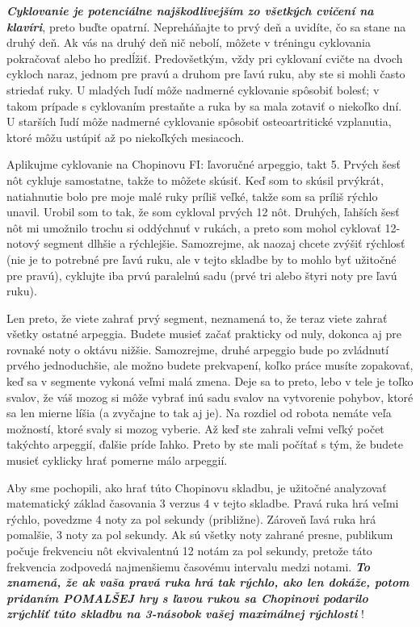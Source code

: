 \documentclass[11pt,a4paper%
]{book}
\begin{document}
\emph{\textbf{Cyklovanie je potenciálne najškodlivejším zo všetkých cvičení na klavíri}}, preto buďte opatrní. Nepreháňajte to prvý deň a uvidíte, čo sa stane na druhý deň. Ak vás na druhý deň nič nebolí, môžete v tréningu cyklovania pokračovať alebo ho predĺžiť. Predovšetkým, vždy pri cyklovaní cvičte na dvoch cykloch naraz, jednom pre pravú a druhom pre ľavú ruku, aby ste si mohli často striedať ruky. U mladých ľudí môže nadmerné cyklovanie spôsobiť bolesť; v takom prípade s cyklovaním prestaňte a ruka by sa mala zotaviť o niekoľko dní. U starších ľudí môže nadmerné cyklovanie spôsobiť osteoartritické vzplanutia, ktoré môžu ustúpiť až po niekoľkých mesiacoch.

Aplikujme cyklovanie na Chopinovu FI: ľavoručné arpeggio, takt 5. Prvých šesť nôt cykluje samostatne, takže to môžete skúsiť. Keď som to skúsil prvýkrát, natiahnutie bolo pre moje malé ruky príliš veľké, takže som sa príliš rýchlo unavil. Urobil som to tak, že som cykloval prvých 12 nôt. Druhých, ľahších šesť nôt mi umožnilo trochu si oddýchnuť v rukách, a preto som mohol cyklovať 12-notový segment dlhšie a rýchlejšie. Samozrejme, ak naozaj chcete zvýšiť rýchlosť (nie je to potrebné pre ľavú ruku, ale v tejto skladbe by to mohlo byť užitočné pre pravú), cyklujte iba prvú paralelnú sadu (prvé tri alebo štyri noty pre ľavú ruku).

Len preto, že viete zahrať prvý segment, neznamená to, že teraz viete zahrať všetky ostatné arpeggia. Budete musieť začať prakticky od nuly, dokonca aj pre rovnaké noty o oktávu nižšie. Samozrejme, druhé arpeggio bude po zvládnutí prvého jednoduchšie, ale možno budete prekvapení, koľko práce musíte zopakovať, keď sa v segmente vykoná veľmi malá zmena. Deje sa to preto, lebo v tele je toľko svalov, že váš mozog si môže vybrať inú sadu svalov na vytvorenie pohybov, ktoré sa len mierne líšia (a zvyčajne to tak aj je). Na rozdiel od robota nemáte veľa možností, ktoré svaly si mozog vyberie. Až keď ste zahrali veľmi veľký počet takýchto arpeggií, ďalšie príde ľahko. Preto by ste mali počítať s tým, že budete musieť cyklicky hrať pomerne málo arpeggií.

Aby sme pochopili, ako hrať túto Chopinovu skladbu, je užitočné analyzovať matematický základ časovania 3 verzus 4 v tejto skladbe. Pravá ruka hrá veľmi rýchlo, povedzme 4 noty za pol sekundy (približne). Zároveň ľavá ruka hrá pomalšie, 3 noty za pol sekundy. Ak sú všetky noty zahrané presne, publikum počuje frekvenciu nôt ekvivalentnú 12 notám za pol sekundy, pretože táto frekvencia zodpovedá najmenšiemu časovému intervalu medzi notami. \emph{\textbf{To znamená, že ak vaša pravá ruka hrá tak rýchlo, ako len dokáže, potom pridaním POMALŠEJ hry s ľavou rukou sa Chopinovi podarilo zrýchliť túto skladbu na 3-násobok vašej maximálnej rýchlosti}} !
\end{document}
